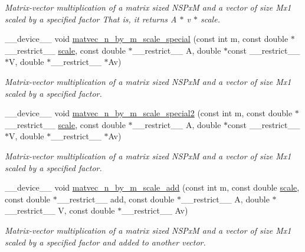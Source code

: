\begin{DoxyCompactItemize}
\begin{DoxyCompactList}\small\item\em Matrix-\/vector multiplication of a matrix sized N\+S\+PxM and a vector of size Mx1 scaled by a specified factor That is, it returns A $\ast$ v $\ast$ scale. \end{DoxyCompactList}\item 
\+\_\+\+\_\+device\+\_\+\+\_\+ void \hyperlink{exponential__linear__algebra_8cuh_aafe924c72a847b1d591e8fecb0efebdc}{matvec\+\_\+n\+\_\+by\+\_\+m\+\_\+scale\+\_\+special} (const int m, const double $\ast$\+\_\+\+\_\+restrict\+\_\+\+\_\+ \hyperlink{radau2a_8cu_a4fab5866449108992478041d2e51a28c}{scale}, const double $\ast$\+\_\+\+\_\+restrict\+\_\+\+\_\+ A, double $\ast$const \+\_\+\+\_\+restrict\+\_\+\+\_\+ $\ast$V, double $\ast$\+\_\+\+\_\+restrict\+\_\+\+\_\+ $\ast$Av)
\begin{DoxyCompactList}\small\item\em Matrix-\/vector multiplication of a matrix sized N\+S\+PxM and a vector of size Mx1 scaled by a specified factor. \end{DoxyCompactList}\item 
\+\_\+\+\_\+device\+\_\+\+\_\+ void \hyperlink{exponential__linear__algebra_8cuh_a6d511f330da8ea1a044ed327a132d290}{matvec\+\_\+n\+\_\+by\+\_\+m\+\_\+scale\+\_\+special2} (const int m, const double $\ast$\+\_\+\+\_\+restrict\+\_\+\+\_\+ \hyperlink{radau2a_8cu_a4fab5866449108992478041d2e51a28c}{scale}, const double $\ast$\+\_\+\+\_\+restrict\+\_\+\+\_\+ A, double $\ast$const \+\_\+\+\_\+restrict\+\_\+\+\_\+ $\ast$V, double $\ast$\+\_\+\+\_\+restrict\+\_\+\+\_\+ $\ast$Av)
\begin{DoxyCompactList}\small\item\em Matrix-\/vector multiplication of a matrix sized N\+S\+PxM and a vector of size Mx1 scaled by a specified factor. \end{DoxyCompactList}\item 
\+\_\+\+\_\+device\+\_\+\+\_\+ void \hyperlink{exponential__linear__algebra_8cuh_a28166d4c2569ab108219b8466bef8a77}{matvec\+\_\+n\+\_\+by\+\_\+m\+\_\+scale\+\_\+add} (const int m, const double \hyperlink{radau2a_8cu_a4fab5866449108992478041d2e51a28c}{scale}, const double $\ast$\+\_\+\+\_\+restrict\+\_\+\+\_\+ add, const double $\ast$\+\_\+\+\_\+restrict\+\_\+\+\_\+ A, double $\ast$\+\_\+\+\_\+restrict\+\_\+\+\_\+ V, const double $\ast$\+\_\+\+\_\+restrict\+\_\+\+\_\+ Av)
\begin{DoxyCompactList}\small\item\em Matrix-\/vector multiplication of a matrix sized N\+S\+PxM and a vector of size Mx1 scaled by a specified factor and added to another vector. \end{DoxyCompactList}\item 

\end{DoxyCompactItemize}
